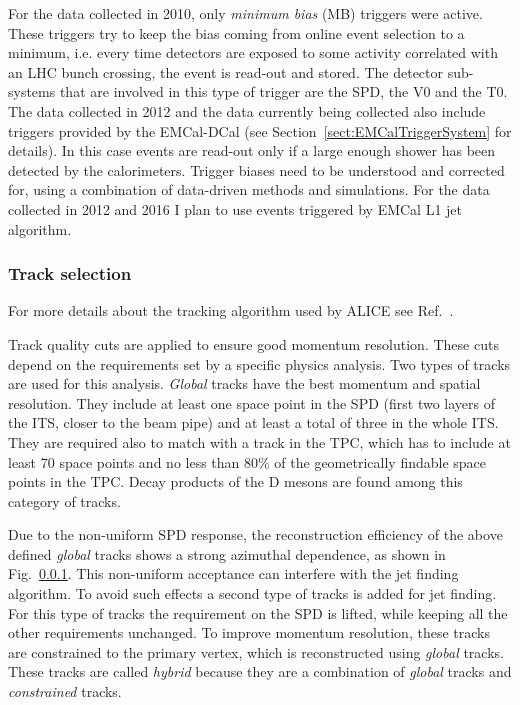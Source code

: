 \documentclass[12pt, a4paper, twoside, titlepage]{article}
\begin{document}
For the data collected in 2010, only \emph{minimum bias} (MB) triggers were active. These triggers
try to keep the bias coming from online event selection to a minimum, i.e. every time detectors
are exposed to some activity correlated with an LHC bunch crossing, the event is read-out and stored.
The detector sub-systems that are involved in this type of trigger are the SPD, the V0 and the T0.
The data collected in 2012 and the data currently being collected also include triggers
provided by the EMCal-DCal (see Section~\ref{sect:EMCalTriggerSystem} for details).
In this case events are read-out only if a large enough shower has been detected by the calorimeters.
Trigger biases need to be understood and corrected for, using a combination of data-driven methods and simulations.
For the data collected in 2012 and 2016 I plan to use events triggered by EMCal L1 jet algorithm.

\subsubsection{Track selection}
For more details about the tracking algorithm used by ALICE see Ref.~\cite{}.

Track quality cuts are applied to ensure good momentum resolution. These cuts
depend on the requirements set by a specific physics analysis.
Two types of tracks are used for this analysis. \emph{Global} tracks have the best
momentum and spatial resolution. They include at least one space point in the SPD (first two
layers of the ITS, closer to the beam pipe) and at least a total of three in the whole ITS. They are required also to
match with a track in the TPC, which has to include at least 70 space points and no less than 80\% of the geometrically findable 
space points in the TPC. Decay products of the D mesons are found among this category of tracks.

Due to the non-uniform SPD response, the reconstruction efficiency of the above defined \emph{global} tracks shows a strong azimuthal dependence,
as shown in Fig.~\ref{}. This non-uniform acceptance can interfere with the jet finding algorithm. To avoid such effects a second type of tracks is added for jet finding.
For this type of tracks the requirement on the SPD is lifted, while keeping all the other requirements unchanged. To improve momentum resolution,
these tracks are constrained to the primary vertex, which is reconstructed using \emph{global} tracks. These tracks are called \emph{hybrid} because
they are a combination of \emph{global} tracks and \emph{constrained} tracks.
\end{document}
